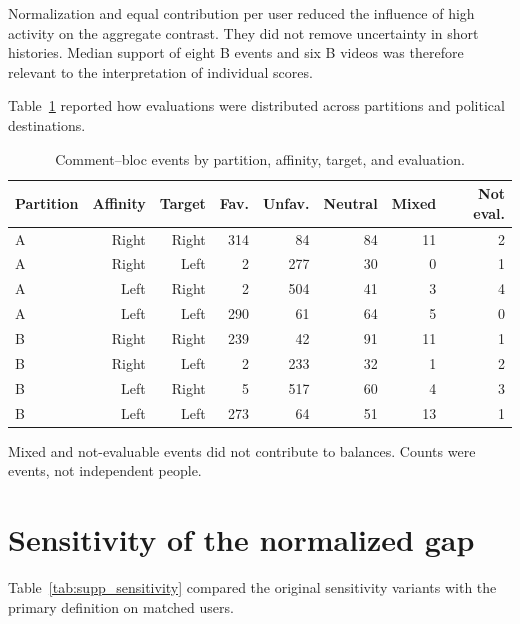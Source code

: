\documentclass[11pt,a4paper]{article}
\begin{document}
Normalization and equal contribution per user reduced the influence of high activity on the aggregate contrast. They did not remove uncertainty in short histories. Median support of eight B events and six B videos was therefore relevant to the interpretation of individual scores.

Table~\ref{tab:supp_composition} reported how evaluations were distributed across partitions and political destinations.

\begin{table}[H]\centering\small
\caption{Comment--bloc events by partition, affinity, target, and evaluation.}
\label{tab:supp_composition}
\setlength{\tabcolsep}{4pt}
\begin{tabular}{lrrrrrrr}\toprule
Partition & Affinity & Target & Fav. & Unfav. & Neutral & Mixed & Not eval.\\\midrule
A & Right & Right & 314 & 84 & 84 & 11 & 2\\
A & Right & Left & 2 & 277 & 30 & 0 & 1\\
A & Left & Right & 2 & 504 & 41 & 3 & 4\\
A & Left & Left & 290 & 61 & 64 & 5 & 0\\
B & Right & Right & 239 & 42 & 91 & 11 & 1\\
B & Right & Left & 2 & 233 & 32 & 1 & 2\\
B & Left & Right & 5 & 517 & 60 & 4 & 3\\
B & Left & Left & 273 & 64 & 51 & 13 & 1\\
\bottomrule\end{tabular}
\par\smallskip\footnotesize Mixed and not-evaluable events did not contribute to balances. Counts were events, not independent people.
\end{table}

\section{Sensitivity of the normalized gap}

Table~\ref{tab:supp_sensitivity} compared the original sensitivity variants with the primary definition on matched users.
\end{document}
